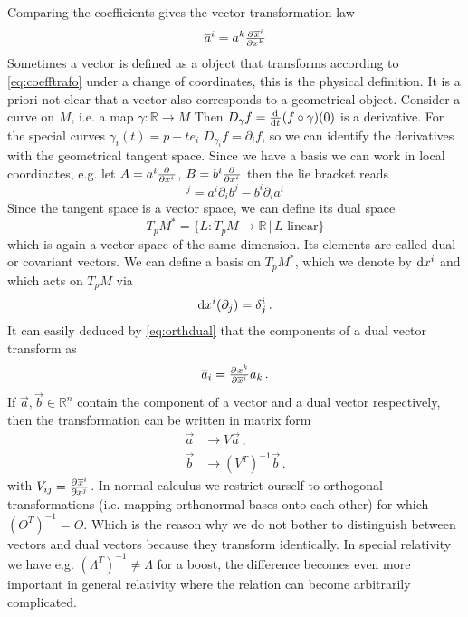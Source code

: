 Comparing the coefficients gives the vector transformation law
\begin{equation}
    \overline{a}^i=a^k\pd{\overline{x}^i}{{x^k}}\label{eq:coefftrafo}
\end{equation}
Sometimes a vector is defined as a object that transforms according to \ref{eq:coefftrafo} under a change of coordinates, 
this is the physical definition. It is a priori not clear that a vector also corresponds to a geometrical object. 
Consider a curve on $M$, i.e. a map $\gamma:\mathbb{R}\to M$
Then $D_\gamma f=\od{}{t}(f\circ\gamma)(0)$ is a derivative.
For the special curves $\gamma_i(t)=p+te_i$
$D_{\gamma_i} f=\partial_if$, so we can identify the derivatives with the geometrical tangent space.
Since we have a basis we can work in local coordinates, e.g. let $A=a^i\pd{}{{x^i}}$, $B=b^i\pd{}{{x^i}}$ then the lie bracket reads
\begin{equation}
    [A,B]^j=a^i\partial_ib^j-b^i\partial_ia^i
\end{equation}
Since the tangent space is a vector space, we can define its dual space
\begin{equation}
    T_pM^*=\{L:T_pM\to \mathbb{R}\, |\, L \text{ linear}\}
\end{equation}
which is again a vector space of the same dimension. Its elements are called dual or covariant vectors.
We can define a basis on $	T_pM^*$, which we denote by $\dif x^i$ and  which acts on $T_pM$ via
\begin{equation}
    \dif x^i(\partial_j)=\delta^i_j\, . \label{eq:orthdual}
\end{equation}
It can easily deduced by \eqref{eq:orthdual} that the components of a dual vector transform as
\begin{equation}
    \overline{a}_i=\pd{x^k}{{\overline{x}^i}}a_k\, .
\end{equation}
If $\vec{a},\vec{b}\in\mathbb{R}^n$ contain the component of a vector and a dual vector respectively, 
then the transformation can be written in matrix form
\begin{align}
    \vec{a}&\to V\vec{a}\, ,\\
    \vec{b}&\to\left(V^T\right)^{-1}\vec{b}\, .
\end{align}
with $V_{ij}=\pd{\overline{x}^i}{{x^j}}$. 
In normal calculus we restrict ourself to orthogonal transformations (i.e. mapping orthonormal bases onto each other) for which $(O^T)^{-1}=O$. 
Which is the reason why we do not bother to distinguish between vectors and dual vectors because they transform identically. 
In special relativity we have e.g. $(\Lambda^T)^{-1}\neq\Lambda$ for a boost, the difference becomes even more important in general 
relativity where the relation can become arbitrarily complicated.
